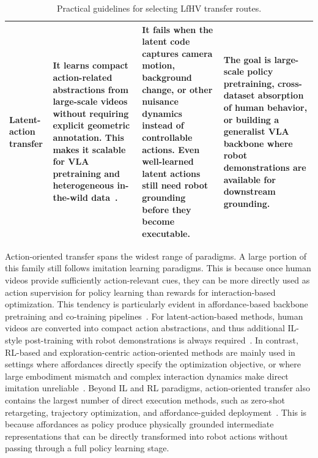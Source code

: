 \documentclass[Afour,sageh,times]{sagej}
\begin{document}
\begin{table}[t]
\begin{tabularx}{\textwidth}{
>{\raggedright\arraybackslash}p{2.3cm}
X
X
X
}
\midrule
Latent-action transfer &
It learns compact action-related abstractions from large-scale videos without requiring explicit geometric annotation. This makes it scalable for VLA pretraining and heterogeneous in-the-wild data~\citep{ye2024latent,chen2024igor,chen2025villa,luo2025being,yang2025egovla}. &
It fails when the latent code captures camera motion, background change, or other nuisance dynamics instead of controllable actions. Even well-learned latent actions still need robot grounding before they become executable. &
The goal is large-scale policy pretraining, cross-dataset absorption of human behavior, or building a generalist VLA backbone where robot demonstrations are available for downstream grounding. \\
\bottomrule
\end{tabularx}
\caption{Practical guidelines for selecting LfHV transfer routes.}
\label{tab:route_selection_guidelines}
\end{table}


Action-oriented transfer spans the widest range of paradigms. A large portion of this family still follows imitation learning paradigms. This is because once human videos provide sufficiently action-relevant cues, they can be more directly used as action supervision for policy learning than rewards for interaction-based optimization. This tendency is particularly evident in affordance-based backbone pretraining and co-training pipelines~\citep{wang2023mimicplay,kareer2025egomimic,yang2025egovla,luo2025being}. For latent-action-based methods, human videos are converted into compact action abstractions, and thus additional IL-style post-training with robot demonstrations is always required~\citep{ye2024latent,chen2024igor,chen2025villa}. In contrast, RL-based and exploration-centric action-oriented methods are mainly used in settings where affordances directly specify the optimization objective, or where large embodiment mismatch and complex interaction dynamics make direct imitation unreliable~\citep{das2021model,sieb2020graph,kumar2023graph,lum2025crossing}. Beyond IL and RL paradigms, action-oriented transfer also contains the largest number of direct execution methods, such as zero-shot retargeting, trajectory optimization, and affordance-guided deployment~\citep{bahl2023affordances,kuang2024ram,chen2025vidbot,zhang2025actron3d,shi2025zeromimic}. This is because affordances as policy produce physically grounded intermediate representations that can be directly transformed into robot actions without passing through a full policy learning stage.
\end{document}

